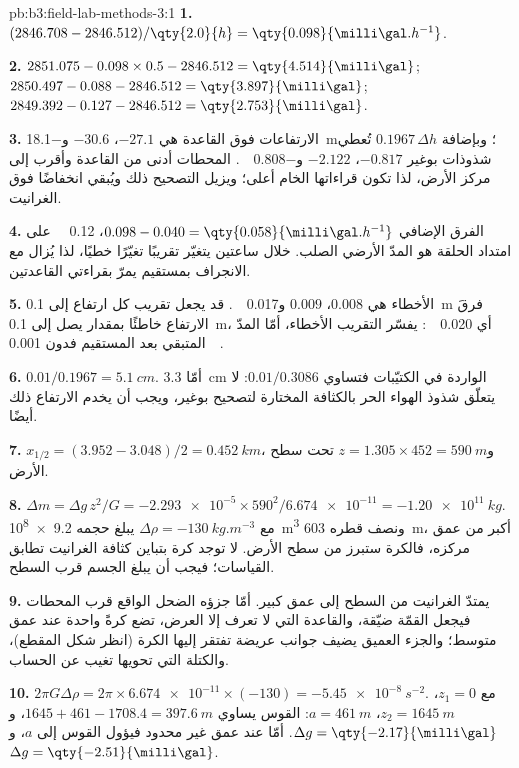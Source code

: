 \begin{solution}{pb:b3:field-lab-methods-3:1}
\textbf{1.} $(2846.708 - 2846.512)/\qty{2.0}{h} = \qty{0.098}{\milli\gal.h^{-1}}$.

\textbf{2.} $2851.075 - 0.098\times0.5 - 2846.512 = \qty{4.514}{\milli\gal}$;
$2850.497 - 0.088 - 2846.512 = \qty{3.897}{\milli\gal}$;
$2849.392 - 0.127 - 2846.512 = \qty{2.753}{\milli\gal}$.

\textbf{3.} الارتفاعات فوق القاعدة هي $-27.1$، $-30.6$
و\qty{-18.1}{m}؛ وبإضافة $0.1967\,\Delta h$ تُعطي شذوذات بوغير
$\num{-0.817}$، $\num{-2.122}$ و\qty{-0.808}{\milli\gal}. المحطات
أدنى من القاعدة وأقرب إلى مركز الأرض،
لذا تكون قراءاتها الخام أعلى؛ ويزيل التصحيح ذلك
ويُبقي انخفاضًا فوق الغرانيت.

\textbf{4.} الفرق الإضافي $0.098 - 0.040 = \qty{0.058}{\milli\gal.h^{-1}}$،
\qty{0.12}{\milli\gal} على امتداد الحلقة هو المدّ الأرضي الصلب. خلال
ساعتين يتغيّر تقريبًا تغيّرًا خطيًا، لذا يُزال مع الانجراف بمستقيم يمرّ بقراءتي
القاعدتين.

\textbf{5.} الأخطاء هي $\num{0.008}$، $\num{0.009}$
و\qty{0.017}{\milli\gal}. قد يجعل تقريب كل ارتفاع إلى \qty{0.1}{m} فرقَ الارتفاع
خاطئًا بمقدار يصل إلى \qty{0.1}{m}، أي
\qty{0.020}{\milli\gal}: يفسّر التقريب الأخطاء، أمّا المدّ
المتبقي بعد المستقيم فدون \qty{0.001}{\milli\gal}.

\textbf{6.} $0.01/0.1967 = \qty{5.1}{cm}$. أمّا \qty{3.3}{cm} الواردة في الكتيّبات فتساوي
$0.01/0.3086$: لا يتعلّق شذوذ الهواء الحر بالكثافة
المختارة لتصحيح بوغير، ويجب أن يخدم الارتفاع ذلك أيضًا.

\textbf{7.} $x_{1/2} = (3.952 - 3.048)/2 = \qty{0.452}{km}$، و$z = 1.305
\times452 = \qty{590}{m}$ تحت سطح الأرض.

\textbf{8.} $\Delta m = \Delta g\,z^2/G = \num{-2.293e-5}\times590^2/
\num{6.674e-11} = \qty{-1.20e11}{kg}$. مع $\Delta\rho =
\qty{-130}{kg.m^{-3}}$ يبلغ حجمه \qty{9.2e8}{m^3} ونصف قطره
\qty{603}{m}، أكبر من عمق مركزه، فالكرة ستبرز
من سطح الأرض. لا توجد كرة بتباين كثافة الغرانيت تطابق
القياسات؛ فيجب أن يبلغ الجسم قرب السطح.

\textbf{9.} يمتدّ الغرانيت من السطح إلى عمق كبير. أمّا جزؤه الضحل
الواقع قرب المحطات فيجعل القمّة ضيّقة، والقاعدة التي
لا تعرف إلا العرض، تضع كرةً واحدة عند عمق متوسط؛ والجزء العميق
يضيف جوانب عريضة تفتقر إليها الكرة (انظر شكل المقطع)، والكتلة التي تحويها
تغيب عن الحساب.

\textbf{10.} $2\pi G\Delta\rho = 2\pi\times\num{6.674e-11}\times(-130) =
\qty{-5.45e-8}{s^{-2}}$. مع $z_1 = 0$، $z_2 = \qty{1645}{m}$، $a =
\qty{461}{m}$: القوس يساوي $1645 + 461 - 1708.4 = \qty{397.6}{m}$،
و$\Delta g = \qty{-2.17}{\milli\gal}$. أمّا عند عمق غير محدود فيؤول القوس
إلى $a$، و$\Delta g = \qty{-2.51}{\milli\gal}$.


\end{solution}
